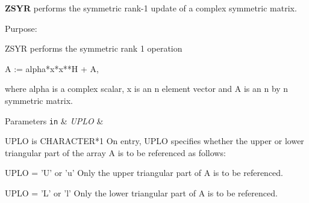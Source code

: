 {\bfseries Z\+S\+Y\+R} performs the symmetric rank-\/1 update of a complex symmetric matrix. 

 \begin{DoxyParagraph}{Purpose\+: }
\begin{DoxyVerb} ZSYR   performs the symmetric rank 1 operation

    A := alpha*x*x**H + A,

 where alpha is a complex scalar, x is an n element vector and A is an
 n by n symmetric matrix.\end{DoxyVerb}
 
\end{DoxyParagraph}

\begin{DoxyParams}[1]{Parameters}
\mbox{\tt in}  & {\em U\+P\+L\+O} & \begin{DoxyVerb}          UPLO is CHARACTER*1
           On entry, UPLO specifies whether the upper or lower
           triangular part of the array A is to be referenced as
           follows:

              UPLO = 'U' or 'u'   Only the upper triangular part of A
                                  is to be referenced.

              UPLO = 'L' or 'l'   Only the lower triangular part of A
                                  is to be referenced.


\end{DoxyVerb}
\end{DoxyParams}
